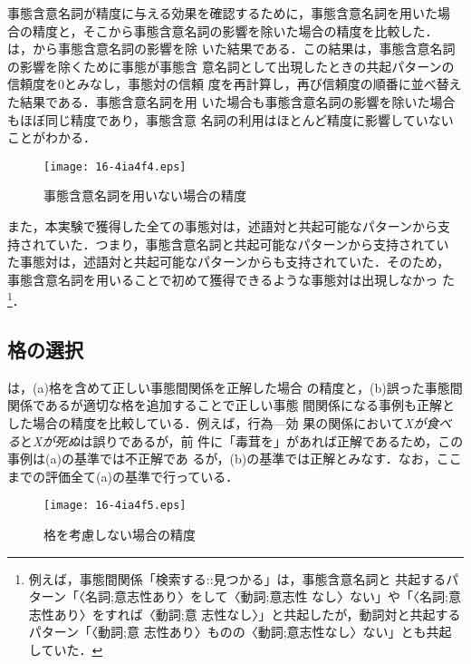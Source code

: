 \documentclass[japanese]{jnlp_1.4}
\begin{document}
事態含意名詞が精度に与える効果を確認するために，事態含意名詞を用いた場
合の精度と，そこから事態含意名詞の影響を除いた場合の精度を比較した．
は，から事態含意名詞の影響を除
いた結果である．この結果は，事態含意名詞の影響を除くために事態が事態含
意名詞として出現したときの共起パターンの信頼度を0とみなし，事態対の信頼
度を再計算し，再び信頼度の順番に並べ替えた結果である．事態含意名詞を用
いた場合も事態含意名詞の影響を除いた場合もほぼ同じ精度であり，事態含意
名詞の利用はほとんど精度に影響していないことがわかる．

\begin{figure}[b]
\begin{center}
  \texttt{[image: 16-4ia4f4.eps]}
\end{center}
  \caption{事態含意名詞を用いない場合の精度}
  \label{fig:without_noun}
\end{figure}

また，本実験で獲得した全ての事態対は，述語対と共起可能なパターンから支
持されていた．つまり，事態含意名詞と共起可能なパターンから支持されてい
た事態対は，述語対と共起可能なパターンからも支持されていた．そのため，
事態含意名詞を用いることで初めて獲得できるような事態対は出現しなかっ
た\footnote{例えば，事態間関係「検索する::見つかる」は，事態含意名詞と
  共起するパターン「〈名詞;意志性あり〉をして〈動詞;意志性
      なし〉ない」や「〈名詞;意志性あり〉をすれば〈動詞;意
      志性なし〉」と共起したが，動詞対と共起するパターン「〈動詞;意
      志性あり〉ものの〈動詞;意志性なし〉ない」とも共起していた．}．


\subsection{格の選択}

は，(a)格を含めて正しい事態間関係を正解した場合
の精度と，(b)誤った事態間関係であるが適切な格を追加することで正しい事態
間関係になる事例も正解とした場合の精度を比較している．例えば，行為—効
果の関係において\textit{Xが食べる}と\textit{Xが死ぬ}は誤りであるが，前
件に「毒茸を」があれば正解であるため，この事例は(a)の基準では不正解であ
るが，(b)の基準では正解とみなす．なお，ここまでの評価全て(a)の基準で行っている．

\begin{figure}[b]
\begin{center}
  \texttt{[image: 16-4ia4f5.eps]}
\end{center}
  \caption{格を考慮しない場合の精度}
  \label{fig:strict_vs_lenient}
\end{figure}
\end{document}
